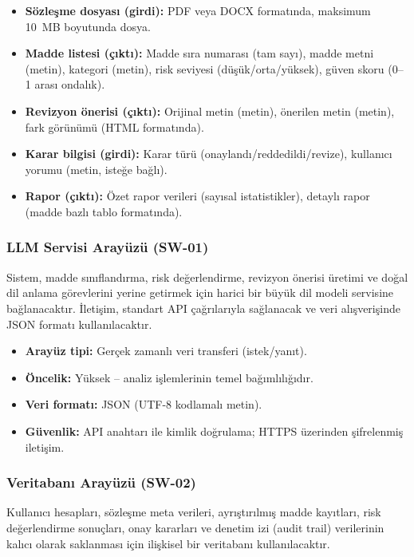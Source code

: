\documentclass[12pt, a4paper]{article}
\begin{document}
\begin{itemize}[leftmargin=2cm]
    \item \textbf{Sözleşme dosyası (girdi):} PDF veya DOCX formatında, maksimum 10~MB boyutunda dosya.
    \item \textbf{Madde listesi (çıktı):} Madde sıra numarası (tam sayı), madde metni (metin), kategori (metin), risk seviyesi (düşük/orta/yüksek), güven skoru (0--1 arası ondalık).
    \item \textbf{Revizyon önerisi (çıktı):} Orijinal metin (metin), önerilen metin (metin), fark görünümü (HTML formatında).
    \item \textbf{Karar bilgisi (girdi):} Karar türü (onaylandı/reddedildi/revize), kullanıcı yorumu (metin, isteğe bağlı).
    \item \textbf{Rapor (çıktı):} Özet rapor verileri (sayısal istatistikler), detaylı rapor (madde bazlı tablo formatında).
\end{itemize}

\subsubsection{LLM Servisi Arayüzü (SW-01)}

Sistem, madde sınıflandırma, risk değerlendirme, revizyon önerisi üretimi ve doğal dil anlama görevlerini yerine getirmek için harici bir büyük dil modeli servisine bağlanacaktır. İletişim, standart API çağrılarıyla sağlanacak ve veri alışverişinde JSON formatı kullanılacaktır.

\begin{itemize}[leftmargin=2cm]
    \item \textbf{Arayüz tipi:} Gerçek zamanlı veri transferi (istek/yanıt).
    \item \textbf{Öncelik:} Yüksek -- analiz işlemlerinin temel bağımlılığıdır.
    \item \textbf{Veri formatı:} JSON (UTF-8 kodlamalı metin).
    \item \textbf{Güvenlik:} API anahtarı ile kimlik doğrulama; HTTPS üzerinden şifrelenmiş iletişim.
\end{itemize}

\subsubsection{Veritabanı Arayüzü (SW-02)}

Kullanıcı hesapları, sözleşme meta verileri, ayrıştırılmış madde kayıtları, risk değerlendirme sonuçları, onay kararları ve denetim izi (audit trail) verilerinin kalıcı olarak saklanması için ilişkisel bir veritabanı kullanılacaktır.
\end{document}
